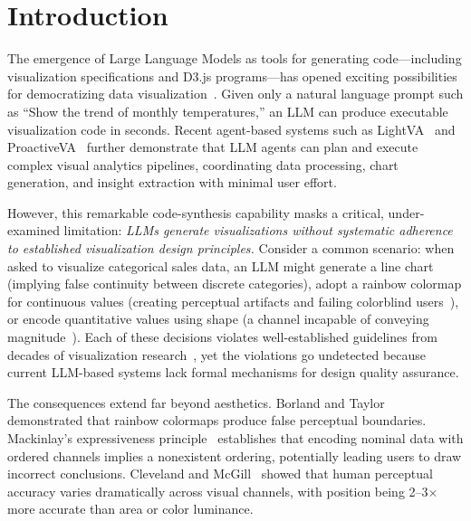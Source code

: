 \documentclass[final,5p,times,twocolumn]{elsarticle}
\begin{document}
\linenumbers

\section{Introduction}
\label{sec:intro}

The emergence of Large Language Models as tools for generating code---including visualization specifications and D3.js programs---has opened exciting possibilities for democratizing data visualization~\cite{dibia2023lida,li2024lightva,zhao2025proactiveva}.
Given only a natural language prompt such as ``Show the trend of monthly temperatures,'' an LLM can produce executable visualization code in seconds.
Recent agent-based systems such as LightVA~\cite{li2024lightva} and ProactiveVA~\cite{zhao2025proactiveva} further demonstrate that LLM agents can plan and execute complex visual analytics pipelines, coordinating data processing, chart generation, and insight extraction with minimal user effort.

However, this remarkable code-synthesis capability masks a critical, under-examined limitation: \textit{LLMs generate visualizations without systematic adherence to established visualization design principles.}
Consider a common scenario: when asked to visualize categorical sales data, an LLM might generate a line chart (implying false continuity between discrete categories), adopt a rainbow colormap for continuous values (creating perceptual artifacts and failing colorblind users~\cite{borland2007rainbow}), or encode quantitative values using shape (a channel incapable of conveying magnitude~\cite{stevens1946theory}).
Each of these decisions violates well-established guidelines from decades of visualization research~\cite{cleveland1984graphical,mackinlay1986automating,munzner2014visualization}, yet the violations go undetected because current LLM-based systems lack formal mechanisms for design quality assurance.

The consequences extend far beyond aesthetics.
Borland and Taylor~\cite{borland2007rainbow} demonstrated that rainbow colormaps produce false perceptual boundaries.
Mackinlay's expressiveness principle~\cite{mackinlay1986automating} establishes that encoding nominal data with ordered channels implies a nonexistent ordering, potentially leading users to draw incorrect conclusions.
Cleveland and McGill~\cite{cleveland1984graphical} showed that human perceptual accuracy varies dramatically across visual channels, with position being 2--3$\times$ more accurate than area or color luminance.
\end{document}
